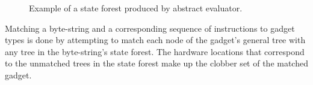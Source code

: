     \begin{figure}
        \centering
        \caption{Example of a state forest produced by abstract evaluator.}
        \label{fig:method-general-trees}
    \end{figure}

    Matching a byte-string and a corresponding sequence of instructions to
    gadget types is done by attempting to match each node of the gadget's
    general tree with any tree in the byte-string's state forest. The hardware
    locations that correspond to the unmatched trees in the state forest make up
    the clobber set of the matched gadget.

